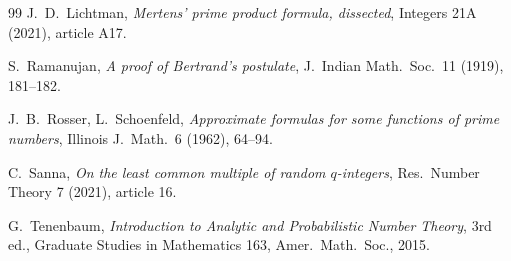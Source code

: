 \documentclass[11pt]{article}
\theoremstyle{remark}
\begin{document}
\begin{thebibliography}{99}
J.~D.~Lichtman, \emph{Mertens' prime product formula, dissected}, Integers 21A (2021), article A17.

S.~Ramanujan, \emph{A proof of Bertrand's postulate}, J.\ Indian Math.\ Soc.\ 11 (1919), 181--182.

J.~B.~Rosser, L.~Schoenfeld, \emph{Approximate formulas for some functions of prime numbers}, Illinois J.\ Math.\ 6 (1962), 64--94.

C.~Sanna, \emph{On the least common multiple of random $q$-integers}, Res.\ Number Theory 7 (2021), article 16.

G.~Tenenbaum, \emph{Introduction to Analytic and Probabilistic Number Theory}, 3rd ed., Graduate Studies in Mathematics 163, Amer.\ Math.\ Soc., 2015.

\end{thebibliography}
\end{document}
